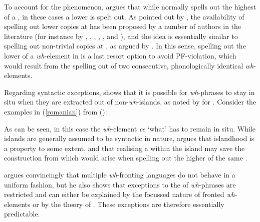 To account for the phenomenon, \citet[367--376]{boskovic2002} argues that while  normally spells out the highest  of a , in these cases a lower  is spelt out. As pointed out by \citet[367--368]{boskovic2002}, the availability of spelling out lower copies at  has been proposed by a number of authors in the literature (for instance by \citealt{bobaljik1995diss}, \citealt{runner1998}, \citealt{pesetsky1997, pesetsky1998}, \citealt{richards1997diss}, \citealt{roberts1997}, and \citealt{nunes1999}), and the idea is essentially similar to spelling out non-trivial copies at , as argued by \citet{chomsky1995}. In this sense, spelling out the lower  of a \textit{wh}-element in  is a last resort option to avoid PF-violation, which would result from the spelling out of two consecutive, phonologically identical \textit{wh}-elements.

Regarding syntactic exceptions, \citet[376--379]{boskovic2002} shows that it is possible for \textit{wh}-phrases to stay in situ when they are extracted out of non-\textit{wh}-islands, as noted by \citet{comorovski1996} for . Consider the examples in (\ref{romanian}) from  (\citealt[377, ex. 65]{boskovic2002}):

\ea \label{romanian}
\z
\z

As can be seen, in this case the \textit{wh}-element \textit{ce} `what' has to remain in situ. While islands are generally assumed to be syntactic in nature, \citet[377--379]{boskovic2002} argues that islandhood is a  property to some extent, and that realising a  within the island may save the construction from  which would arise when spelling out the higher  of the same .

 \citet{boskovic2002} argues convincingly that multiple \textit{wh}-fronting languages do not behave in a uniform fashion, but he also shows that exceptions to the  of \textit{wh}-phrases are restricted and can either be explained by the focussed nature of fronted \textit{wh}-elements or by the  theory of . These exceptions are therefore essentially predictable.

